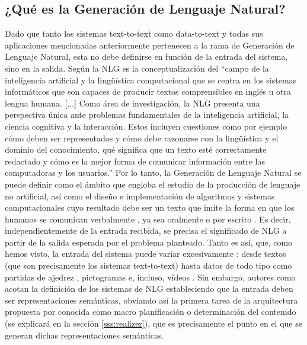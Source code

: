 \subsection{¿Qué es la Generación de Lenguaje Natural?}
Dado que tanto los sistemas text-to-text como data-to-text y todas sus aplicaciones mencionadas anteriormente pertenecen a la rama de Generación de Lenguaje Natural, esta no debe definirse en función de la entrada del sistema, sino en la salida. Según \cite{biblia} la NLG es la conceptualización del ``campo de la inteligencia artificial y la lingüística computacional que se centra en los sistemas informáticos que son capaces de producir textos comprensibles en inglés u otra lengua humana. [...] Como área de investigación, la NLG presenta una perspectiva única ante problemas fundamentales de la inteligencia artificial, la ciencia cognitiva y la interacción. Estos incluyen cuestiones como por ejemplo cómo deben ser representados y cómo debe razonarse con la lingüística y el dominio del conocimiento, qué significa que un texto esté correctamente redactado y cómo es la mejor forma de comunicar información entre las computadoras y los usuarios.'' Por lo tanto, la Generación de Lenguaje Natural se puede definir como el ámbito que engloba el estudio de la producción de lenguaje no artificial, así como el diseño e implementación de algoritmos y sistemas computacionales cuyo resultado debe ser un texto que imite la forma en que los humanos se comunican verbalmente \citep{vicente2015generacion}, ya sea oralmente o por escrito \citep{del2007que}. Es decir, independientemente de la entrada recibida, se precisa el significado de NLG a partir de la salida esperada por el problema planteado. Tanto es así, que, como hemos visto, la entrada del sistema puede variar excesivamente \citep{mcdonald1993issues}: desde textos (que son precisamente los sistemas text-to-text) hasta datos de todo tipo como partidas de ajedrez \citep{gervas2014composing}, pictogramas \citep{gonzalez2019traductor} e, incluso, vídeos \citep{thomason2014integrating}. Sin embargo, autores como \cite{duvsek2020evaluating} acotan la definición de los sistemas de NLG estableciendo que la entrada deben ser representaciones semánticas, obviando así la primera tarea de la arquitectura propuesta por \cite{biblia} conocida como macro planificación o determinación del contenido (se explicará en la sección \ref{sss:realizer}), que es precisamente el punto en el que se generan dichas representaciones semánticas.

